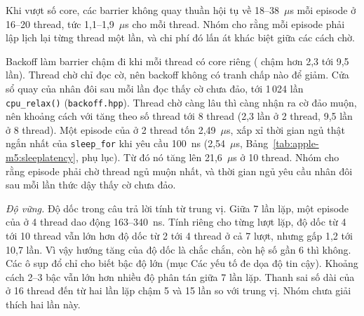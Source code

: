 Khi vượt số core, các barrier không quay thuần hội tụ về 18--38~$\mu$s mỗi episode ở 16--20 thread, tức
1,1--1,9~$\mu$s cho mỗi thread. Nhóm cho rằng mỗi episode phải lập lịch lại từng thread một lần, và chi
phí đó lấn át khác biệt giữa các cách chờ.

Backoff làm barrier chậm đi khi mỗi thread có core riêng ( chậm hơn 
2,3 tới 9,5 lần). Thread chờ chỉ đọc cờ, nên backoff không có tranh chấp nào để giảm. Cửa sổ quay của
 nhân đôi sau mỗi lần đọc thấy cờ chưa đảo, tới 1\,024 lần \texttt{cpu\_relax()}
(\texttt{backoff.hpp}). Thread chờ càng lâu thì càng nhận ra cờ đảo muộn, nên khoảng cách với
 tăng theo số thread tới 8 thread (2,3 lần ở 2 thread, 9,5 lần ở 8 thread). Một episode của
 ở 2 thread tốn 2,49~$\mu$s, xấp xỉ thời gian ngủ thật ngắn nhất của
\texttt{sleep\_for} khi yêu cầu 100~ns (2,54~$\mu$s, Bảng~\ref{tab:apple-m5:sleeplatency}, phụ lục). Từ
đó nó tăng lên 21,6~$\mu$s ở 10 thread. Nhóm cho rằng episode phải chờ thread ngủ muộn nhất, và thời
gian ngủ yêu cầu nhân đôi sau mỗi lần thức dậy thấy cờ chưa đảo.

\emph{Độ vững.} Độ dốc trong câu trả lời tính từ trung vị. Giữa 7 lần lặp, một episode của 
ở 4 thread dao động 163--340~ns. Tính riêng cho từng lượt lặp, độ dốc từ 4 tới 10 thread vẫn lớn hơn độ
dốc từ 2 tới 4 thread ở cả 7 lượt, nhưng gấp 1,2 tới 10,7 lần. Vì vậy hướng tăng của độ dốc là chắc
chắn, còn hệ số gần 6 thì không. Các ô sụp đổ chỉ cho biết bậc độ lớn (mục Các yếu tố đe dọa độ tin cậy).
Khoảng cách 2--3 bậc vẫn lớn hơn nhiều độ phân tán giữa 7 lần lặp. Thanh sai số dài của
 ở 16 thread đến từ hai lần lặp chậm 5 và 15 lần so với trung vị. Nhóm chưa giải
thích hai lần này.
